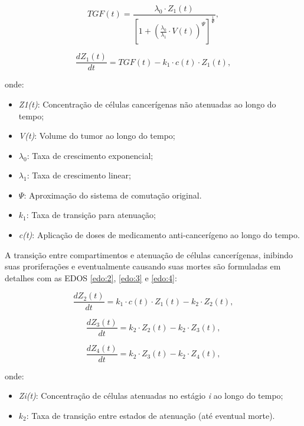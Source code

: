 \documentclass[12pt]{article}
\begin{document}
\begin{equation} \label{eq:1}
    TGF(t) = \frac{\lambda_0 \cdot Z_1(t)}{\left[1 + \left(\frac{\lambda_0}{\lambda_1} \cdot V(t)\right)^\Psi\right]^{\frac{1}{\Psi}}},
\end{equation}

\begin{equation} \label{edo:1}
    \frac{dZ_1(t)}{dt} = TGF(t) - k_1 \cdot c(t) \cdot Z_1(t),
\end{equation}

onde:

\begin{itemize}
    \setlength{\itemsep}{10pt}
    \item \emph{Z1(t)}: Concentração de células cancerígenas não atenuadas ao longo do tempo;
    \item \emph{V(t)}: Volume do tumor ao longo do tempo;
    \item \(\lambda_0\): Taxa de crescimento exponencial;
    \item \(\lambda_1\): Taxa de crescimento linear;
    \item \(\Psi\): Aproximação do sistema de comutação original.
    \item \(k_1\): Taxa de transição para atenuação;
    \item \emph{c(t)}: Aplicação de doses de medicamento anti-cancerígeno ao longo do tempo.
\end{itemize}

A transição entre compartimentos e atenuação de células cancerígenas, inibindo suas proriferações e eventualmente causando suas mortes são formuladas em detalhes com as EDOS \ref{edo:2}, \ref{edo:3} e \ref{edo:4}:

\begin{equation} \label{edo:2}
    \frac{dZ_2(t)}{dt} = k_1 \cdot c(t) \cdot Z_1(t) - k_2 \cdot Z_2(t),
\end{equation}

\begin{equation} \label{edo:3}
    \frac{dZ_3(t)}{dt} = k_2 \cdot Z_2(t) - k_2 \cdot Z_3(t),
\end{equation}

\begin{equation} \label{edo:4}
    \frac{dZ_4(t)}{dt} = k_2 \cdot Z_3(t) - k_2 \cdot Z_4(t),
\end{equation}

onde:

\begin{itemize}
    \setlength{\itemsep}{10pt}
    \item \emph{Zi(t)}: Concentração de células atenuadas no estágio \emph{i} ao longo do tempo;
    \item \(k_2\): Taxa de transição entre estados de atenuação (até eventual morte).
\end{itemize}
\end{document}
